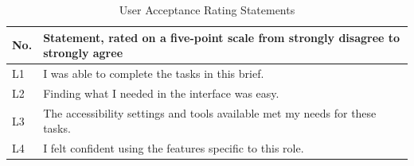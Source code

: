 \documentclass[12pt, oneside]{article} %
\begin{document}
\begin{table}[H]
\caption{User Acceptance Rating Statements}
\label{tab:uat_likert}
\vspace{-4mm}
\begin{center}
\renewcommand{\arraystretch}{1.2}
\footnotesize
\begin{tabular}{|>{\raggedright\arraybackslash}p{1.2cm}|>{\raggedright\arraybackslash}p{12.8cm}|}
\hline
\textbf{No.} & \textbf{Statement, rated on a five-point scale from strongly disagree to strongly agree} \\
\hline \hline
L1 & I was able to complete the tasks in this brief. \\ \hline
L2 & Finding what I needed in the interface was easy. \\ \hline
L3 & The accessibility settings and tools available met my needs for these tasks. \\ \hline
L4 & I felt confident using the features specific to this role. \\ \hline
\end{tabular}
\end{center}
\end{table}
\end{document}
